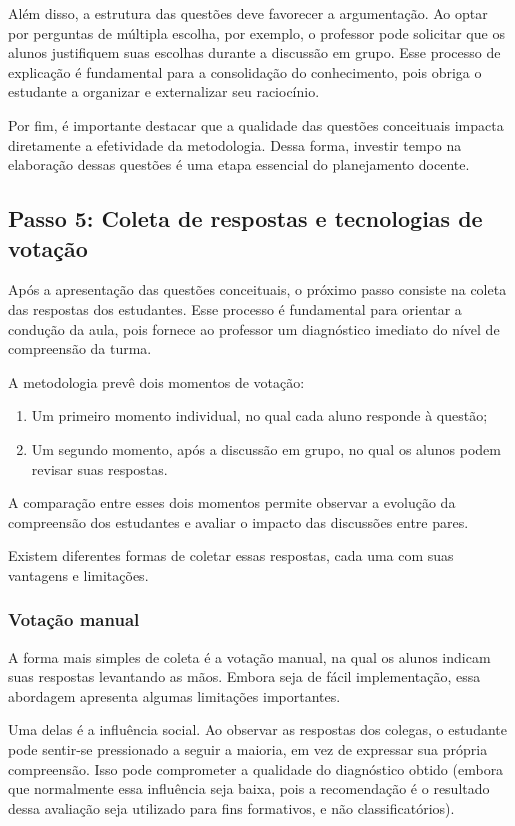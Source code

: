 Além disso, a estrutura das questões deve favorecer a argumentação. Ao optar por perguntas de múltipla escolha, por exemplo, o professor pode solicitar que os alunos justifiquem suas escolhas durante a discussão em grupo. Esse processo de explicação é fundamental para a consolidação do conhecimento, pois obriga o estudante a organizar e externalizar seu raciocínio.

Por fim, é importante destacar que a qualidade das questões conceituais impacta diretamente a efetividade da metodologia. Dessa forma, investir tempo na elaboração dessas questões é uma etapa essencial do planejamento docente.

\subsection{Passo 5: Coleta de respostas e tecnologias de votação}

Após a apresentação das questões conceituais, o próximo passo consiste na coleta das respostas dos estudantes. Esse processo é fundamental para orientar a condução da aula, pois fornece ao professor um diagnóstico imediato do nível de compreensão da turma.

A metodologia prevê dois momentos de votação:

\begin{enumerate}[label=(\roman*)]
    \item Um primeiro momento individual, no qual cada aluno responde à questão;
    \item Um segundo momento, após a discussão em grupo, no qual os alunos podem revisar suas respostas.
\end{enumerate}

A comparação entre esses dois momentos permite observar a evolução da compreensão dos estudantes e avaliar o impacto das discussões entre pares.

Existem diferentes formas de coletar essas respostas, cada uma com suas vantagens e limitações.

\subsubsection{Votação manual}

A forma mais simples de coleta é a votação manual, na qual os alunos indicam suas respostas levantando as mãos. Embora seja de fácil implementação, essa abordagem apresenta algumas limitações importantes.

Uma delas é a influência social. Ao observar as respostas dos colegas, o estudante pode sentir-se pressionado a seguir a maioria, em vez de expressar sua própria compreensão. Isso pode comprometer a  qualidade do diagnóstico obtido (embora que normalmente essa influência seja baixa, pois a recomendação é o resultado dessa avaliação seja utilizado para fins formativos, e não classificatórios).

